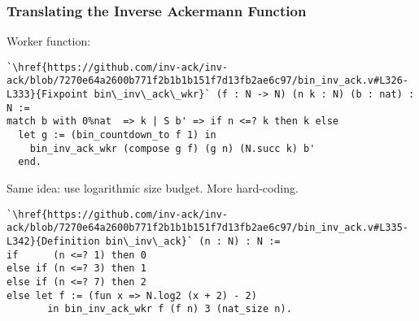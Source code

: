 \begin{frame}[fragile]
\frametitle{Translating the Inverse Ackermann Function}

Worker function:

\begin{lstlisting}
`\href{https://github.com/inv-ack/inv-ack/blob/7270e64a2600b771f2b1b1b151f7d13fb2ae6c97/bin_inv_ack.v#L326-L333}{Fixpoint bin\_inv\_ack\_wkr}` (f : N -> N) (n k : N) (b : nat) : N :=
match b with 0%nat  => k | S b' => if n <=? k then k else
  let g := (bin_countdown_to f 1) in
    bin_inv_ack_wkr (compose g f) (g n) (N.succ k) b'
  end.
\end{lstlisting}

\pause 
Same idea: use logarithmic size budget. More hard-coding.

\pause 
\begin{lstlisting}
`\href{https://github.com/inv-ack/inv-ack/blob/7270e64a2600b771f2b1b1b151f7d13fb2ae6c97/bin_inv_ack.v#L335-L342}{Definition bin\_inv\_ack}` (n : N) : N :=
if      (n <=? 1) then 0
else if (n <=? 3) then 1
else if (n <=? 7) then 2
else let f := (fun x => N.log2 (x + 2) - 2)
       in bin_inv_ack_wkr f (f n) 3 (nat_size n).
\end{lstlisting}

\end{frame}